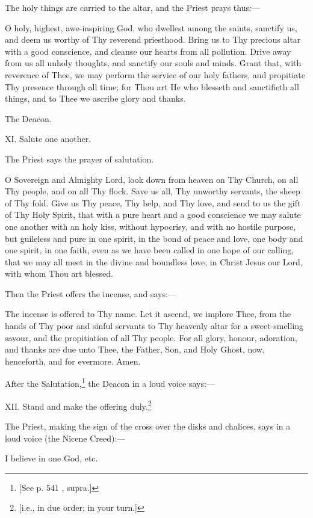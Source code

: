 The holy things are carried to the altar, and the Priest prays thus:—

O holy, highest, awe-inspiring God, who dwellest among the saints, sanctify us, and deem us worthy of Thy reverend priesthood. Bring us to Thy precious altar with a good conscience, and cleanse our hearts from all pollution. Drive away from us all unholy thoughts, and sanctify our souls and minds. Grant that, with reverence of Thee, we may perform the service of our holy fathers, and propitiate Thy presence through all time; for Thou art He who blesseth and sanctifieth all things, and to Thee we ascribe glory and thanks.

The Deacon.

XI. Salute one another.

The Priest says the prayer of salutation.

O Sovereign and Almighty Lord, look down from heaven on Thy Church, on all Thy people, and on all Thy flock. Save us all, Thy unworthy servants, the sheep of Thy fold. Give us Thy peace, Thy help, and Thy love, and send to us the gift of Thy Holy Spirit, that with a pure heart and a good conscience we may salute one another with an holy kiss, without hypocrisy, and with no hostile purpose, but guileless and pure in one spirit, in the bond of peace and love, one body and one spirit, in one faith, even as we have been called in one hope of our calling, that we may all meet in the divine and boundless love, in Christ Jesus our Lord, with whom Thou art blessed.

Then the Priest offers the incense, and says:—

The incense is offered to Thy name. Let it ascend, we implore Thee, from the hands of Thy poor and sinful servants to Thy heavenly altar for a sweet-smelling savour, and the propitiation of all Thy people. For all glory, honour, adoration, and thanks are due unto Thee, the Father, Son, and Holy Ghost, now, henceforth, and for evermore. Amen.

After the Salutation,\footnote{\par{}  [See p. 541 , supra.]} the Deacon in a loud voice says:—

XII. Stand and make the offering duly.\footnote{\par{}  [i.e., in due order; in your turn.]}

The Priest, making the sign of the cross over the disks and chalices, says in a loud voice (the Nicene Creed):—

I believe in one God, etc.

